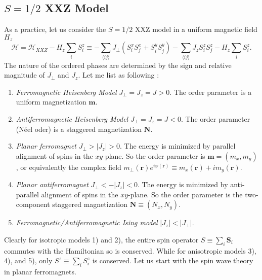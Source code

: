 \documentclass[10pt,nofootinbib]{revtex4}
\def\H{\mathcal{H}}
\begin{document}
	\subsection{$S=1/2$ XXZ Model}
		As a practice, let us consider the $S=1/2$ XXZ model in a uniform magnetic field $H_z$
		\begin{equation}\label{1.1.1}
			\H=\H_{XXZ}-H_z\sum_i S_i^z\equiv-\sum_{\langle ij\rangle}J_\perp(S_i^xS_j^x+S_i^yS_j^y)-\sum_{\langle ij\rangle}J_zS_i^zS_j^z-H_z\sum_i S_i^z.
		\end{equation}
		The nature of the ordered phases are determined by the sign and relative magnitude of $J_\perp$ and $J_z$. Let me list as following \cite{chaikin2000principles}:
		\begin{enumerate}[label=\arabic*)]
			\item \emph{Ferromagnetic Heisenberg Model} $J_\perp=J_z=J>0$. The order parameter is a uniform magnetization $\bm{m}$.
			\item \emph{Antiferromagnetic Heisenberg Model} $J_\perp=J_z=J<0$. The order parameter (N\'{e}el oder) is a staggered magnetization $\bm{N}$.
			\item \emph{Planar ferromagnet} $J_\perp>|J_z|>0$. The energy is minimized by parallel alignment of spins in the $xy$-plane. So the order parameter is $\bm{m}=(m_x,m_y)$, or equivalently the complex field $m_\perp(\bm{r})e^{i\varphi(\bm{r})}\equiv m_x(\bm{r})+im_y(\bm{r})$.
			\item \emph{Planar antiferromagnet} $J_\perp<-|J_z|<0$. The energy is minimized by anti-parallel alignment of spins in the $xy$-plane. So the order parameter is the two-component staggered magnetization $\bm{N}\equiv(N_x,N_y)$.
			\item \emph{Ferromagnetic/Antiferromagnetic Ising model} $|J_z|<|J_\perp|$.
		\end{enumerate}
		Clearly for isotropic models 1) and 2), the entire spin operator $S\equiv\sum_i\bm{S}_i$ commutes with the Hamiltonian so is conserved. While for anisotropic models 3), 4), and 5), only $S^z\equiv\sum_i S_i^z$ is conserved. Let us start with the spin wave theory in planar ferromagnets.
\end{document}
